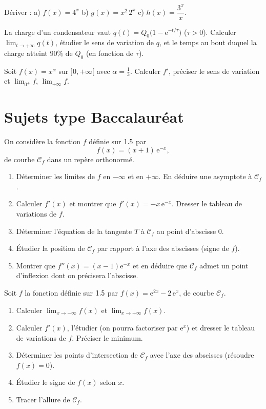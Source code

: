 \exo{} Dériver : a) $f(x)=4^{x}$ \quad b) $g(x)=x^{2}\,2^{x}$ \quad
c) $h(x)=\dfrac{3^{x}}{x}$.

\exo{} La charge d'un condensateur vaut $q(t)=Q_0\big(1-\mathrm{e}^{-t/\tau}\big)$
($\tau>0$). Calculer $\lim_{t\to+\infty}q(t)$, étudier le sens de variation de $q$, et le temps
au bout duquel la charge atteint $90\%$ de $Q_0$ (en fonction de $\tau$).

\exo{} Soit $f(x)=x^{\alpha}$ sur $]0,+\infty[$ avec $\alpha=\tfrac13$. Calculer $f'$,
préciser le sens de variation et $\lim_{0^{+}}f$, $\lim_{+\infty}f$.

\section{Sujets type Baccalauréat}

On considère la fonction $f$ définie sur $1.5$ par
\[
f(x)=(x+1)\,\mathrm{e}^{-x},
\]
de courbe $\mathcal C_f$ dans un repère orthonormé.
\begin{enumerate}[label=\arabic*)]
\item Déterminer les limites de $f$ en $-\infty$ et en $+\infty$. En déduire une asymptote à
$\mathcal C_f$.
\item Calculer $f'(x)$ et montrer que $f'(x)=-x\,\mathrm{e}^{-x}$. Dresser le tableau de
variations de $f$.
\item Déterminer l'équation de la tangente $T$ à $\mathcal C_f$ au point d'abscisse $0$.
\item Étudier la position de $\mathcal C_f$ par rapport à l'axe des abscisses (signe de $f$).
\item Montrer que $f''(x)=(x-1)\mathrm{e}^{-x}$ et en déduire que $\mathcal C_f$ admet un point
d'inflexion dont on précisera l'abscisse.
\end{enumerate}

Soit $f$ la fonction définie sur $1.5$ par $f(x)=\mathrm{e}^{2x}-2\,\mathrm{e}^{x}$, de courbe
$\mathcal C_f$.
\begin{enumerate}[label=\arabic*)]
\item Calculer $\displaystyle\lim_{x\to-\infty}f(x)$ et $\displaystyle\lim_{x\to+\infty}f(x)$.
\item Calculer $f'(x)$, l'étudier (on pourra factoriser par $\mathrm{e}^{x}$) et dresser le
tableau de variations de $f$. Préciser le minimum.
\item Déterminer les points d'intersection de $\mathcal C_f$ avec l'axe des abscisses
(résoudre $f(x)=0$).
\item Étudier le signe de $f(x)$ selon $x$.
\item Tracer l'allure de $\mathcal C_f$.
\end{enumerate}

